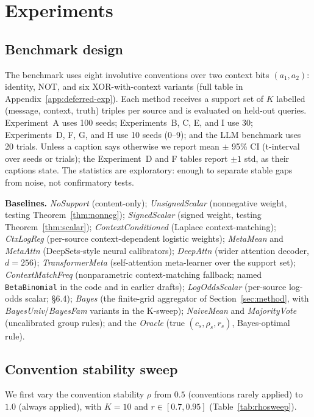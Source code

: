 \section{Experiments}
\label{sec:experiments}

\subsection{Benchmark design}

The benchmark uses eight involutive conventions over two context bits
$(a_1, a_2)$: identity, NOT, and six XOR-with-context variants (full table
in Appendix~\ref{app:deferred-exp}). Each method receives a support set of
$K$ labelled (message, context, truth) triples per source and is evaluated
on held-out queries. Experiment~A uses 100 seeds; Experiments~B, C, E,
and I use 30; Experiments~D, F, G, and H use 10 seeds (0--9);
and the LLM benchmark uses 20 trials. Unless a caption says otherwise
we report mean $\pm$ 95\% CI (t-interval over seeds or trials); the
Experiment~D and F tables report $\pm 1$ std, as their captions state.
The statistics are exploratory: enough
to separate stable gaps from noise, not confirmatory tests.



\textbf{Baselines.} \emph{NoSupport} (content-only); \emph{UnsignedScalar}
(nonnegative weight, testing Theorem~\ref{thm:nonneg});
\emph{SignedScalar} (signed weight, testing Theorem~\ref{thm:scalar});
\emph{ContextConditioned} (Laplace context-matching);
\emph{CtxLogReg} (per-source context-dependent logistic weights);
\emph{MetaMean} and \emph{MetaAttn} (DeepSets-style neural calibrators);
\emph{DeepAttn} (wider attention decoder, $d=256$);
\emph{TransformerMeta} (self-attention meta-learner over the support set);
\emph{ContextMatchFreq} (nonparametric context-matching fallback;
named \texttt{BetaBinomial} in the code and in earlier drafts);
\emph{LogOddsScalar} (per-source log-odds scalar; \S6.4);
\emph{Bayes} (the finite-grid aggregator of Section~\ref{sec:method}, with
\emph{BayesUniv}/\emph{BayesFam} variants in the K-sweep);
\emph{NaiveMean} and \emph{MajorityVote} (uncalibrated group rules); and the
\emph{Oracle} (true $(c_s,\rho_s,r_s)$, Bayes-optimal rule).

\subsection{Convention stability sweep}

We first vary the convention stability $\rho$ from $0.5$ (conventions
rarely applied) to $1.0$ (always applied), with $K=10$ and
$r \in [0.7, 0.95]$ (Table~\ref{tab:rhosweep}).

